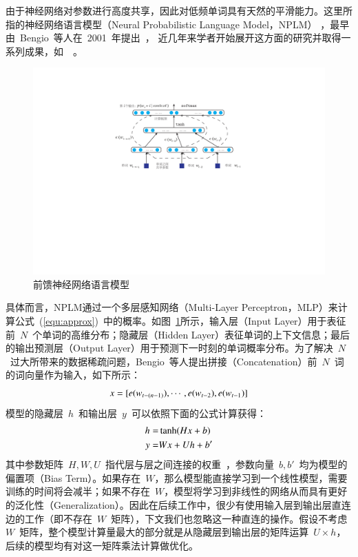 由于神经网络对参数进行高度共享，因此对低频单词具有天然的平滑能力。这里所指的神经网络语言模型（Neural Probabilistic Language Model，NPLM） ，最早由~Bengio~等人在~2001~年提出~， 近几年来学者开始展开这方面的研究并取得一系列成果，如~\cite{DBLP:conf/acl/BaroniDK14,DBLP:journals/sigkdd/BellK07,DBLP:journals/pami/BengioCV13,DBLP:journals/tnn/BengioSF94}~。
\begin{figure}
  \centering
  \includegraphics[width=.85\linewidth]{./figures/nplm.pdf}
  \caption{前馈神经网络语言模型}\label{fig:nplm}
\end{figure}

具体而言，NPLM通过一个多层感知网络（Multi-Layer Perceptron，MLP）来计算公式~(\ref{equ:approx})~中的概率。如图~\ref{fig:nplm}所示，输入层（Input Layer）用于表征前~$N$~个单词的高维分布；隐藏层（Hidden Layer）表征单词的上下文信息；最后的输出预测层（Output Layer）用于预测下一时刻的单词概率分布。为了解决~$N$~过大所带来的数据稀疏问题，Bengio~等人提出拼接（Concatenation）前~$N$~词的词向量作为输入，如下所示：
\begin{equation}\label{equ:we}
\setlength{\abovedisplayskip}{10pt}
\setlength{\belowdisplayskip}{10pt}
  x = [e(w_{t-(n-1)}), \cdots , e(w_{t-2}), e{(w_{t-1})}]
\end{equation}
模型的隐藏层~$h$~和输出层~$y$~可以依照下面的公式计算获得：
\begin{equation}\label{equ:nplm}
\setlength{\abovedisplayskip}{10pt}
\setlength{\belowdisplayskip}{10pt}
\begin{split}
h =& \tanh(Hx+b) \\
y =&Wx + Uh +b'
\end{split}
\end{equation}
其中参数矩阵~$H,W,U$~指代层与层之间连接的权重~，参数向量~$b,b'$~均为模型的偏置项（Bias Term）。如果存在~$W$，那么模型能直接学习到一个线性模型，需要训练的时间将会减半；如果不存在~$W$，模型将学习到非线性的网络从而具有更好的泛化性（Generalization）。因此在后续工作中，很少有使用输入层到输出层直连边的工作（即不存在~$W$~矩阵），下文我们也忽略这一种直连的操作。假设不考虑~$W$~矩阵，整个模型计算量最大的部分就是从隐藏层到输出层的矩阵运算~$U\times h$，后续的模型均有对这一矩阵乘法计算做优化。

